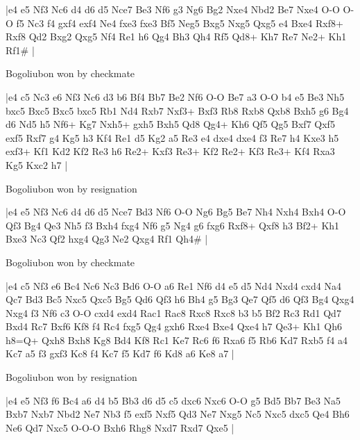 \makegametitle
|e4 e5 Nf3 Nc6 d4 d6 d5 Nce7 Be3 Nf6 g3 Ng6 Bg2 Nxe4 Nbd2 Be7 Nxe4 O-O O-O f5 Nc3 f4 gxf4 exf4 Ne4 fxe3 fxe3 Bf5 Neg5 Bxg5 Nxg5 Qxg5 e4 Bxe4 Rxf8+ Rxf8 Qd2 Bxg2 Qxg5 Nf4 Re1 h6 Qg4 Bh3 Qh4 Rf5 Qd8+ Kh7 Re7 Ne2+ Kh1 Rf1\#  |

\showboard

Bogoliubon won by checkmate

\makegametitle
|e4 c5 Nc3 e6 Nf3 Nc6 d3 b6 Bf4 Bb7 Be2 Nf6 O-O Be7 a3 O-O b4 e5 Be3 Nh5 bxc5 Bxc5 Bxc5 bxc5 Rb1 Nd4 Rxb7 Nxf3+ Bxf3 Rb8 Rxb8 Qxb8 Bxh5 g6 Bg4 d6 Nd5 h5 Nf6+ Kg7 Nxh5+ gxh5 Bxh5 Qd8 Qg4+ Kh6 Qf5 Qg5 Bxf7 Qxf5 exf5 Rxf7 g4 Kg5 h3 Kf4 Re1 d5 Kg2 a5 Re3 e4 dxe4 dxe4 f3 Re7 h4 Kxe3 h5 exf3+ Kf1 Kd2 Kf2 Re3 h6 Re2+ Kxf3 Re3+ Kf2 Re2+ Kf3 Re3+ Kf4 Rxa3 Kg5 Kxc2 h7  |

\showboard

Bogoliubon won by resignation

\makegametitle
|e4 e5 Nf3 Nc6 d4 d6 d5 Nce7 Bd3 Nf6 O-O Ng6 Bg5 Be7 Nh4 Nxh4 Bxh4 O-O Qf3 Bg4 Qe3 Nh5 f3 Bxh4 fxg4 Nf6 g5 Ng4 g6 fxg6 Rxf8+ Qxf8 h3 Bf2+ Kh1 Bxe3 Nc3 Qf2 hxg4 Qg3 Ne2 Qxg4 Rf1 Qh4\#  |

\showboard

Bogoliubon won by checkmate

\makegametitle
|e4 c5 Nf3 e6 Bc4 Nc6 Nc3 Bd6 O-O a6 Re1 Nf6 d4 e5 d5 Nd4 Nxd4 cxd4 Na4 Qc7 Bd3 Bc5 Nxc5 Qxc5 Bg5 Qd6 Qf3 h6 Bh4 g5 Bg3 Qe7 Qf5 d6 Qf3 Bg4 Qxg4 Nxg4 f3 Nf6 c3 O-O cxd4 exd4 Rac1 Rac8 Rxc8 Rxc8 b3 b5 Bf2 Rc3 Rd1 Qd7 Bxd4 Rc7 Bxf6 Kf8 f4 Rc4 fxg5 Qg4 gxh6 Rxe4 Bxe4 Qxe4 h7 Qe3+ Kh1 Qh6 h8=Q+ Qxh8 Bxh8 Kg8 Bd4 Kf8 Rc1 Ke7 Rc6 f6 Rxa6 f5 Rb6 Kd7 Rxb5 f4 a4 Kc7 a5 f3 gxf3 Kc8 f4 Kc7 f5 Kd7 f6 Kd8 a6 Ke8 a7  |

\showboard

Bogoliubon won by resignation

\makegametitle
|e4 e5 Nf3 f6 Bc4 a6 d4 b5 Bb3 d6 d5 c5 dxc6 Nxc6 O-O g5 Bd5 Bb7 Be3 Na5 Bxb7 Nxb7 Nbd2 Ne7 Nb3 f5 exf5 Nxf5 Qd3 Ne7 Nxg5 Nc5 Nxc5 dxc5 Qe4 Bh6 Ne6 Qd7 Nxc5 O-O-O Bxh6 Rhg8 Nxd7 Rxd7 Qxe5  |

\showboard

